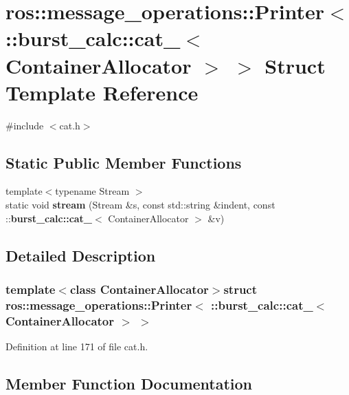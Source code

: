 \section{ros\-:\-:message\-\_\-operations\-:\-:\-Printer$<$ \-:\-:burst\-\_\-calc\-:\-:cat\-\_\-$<$ \-Container\-Allocator $>$ $>$ \-Struct \-Template \-Reference}
\label{structros_1_1message__operations_1_1Printer_3_01_1_1burst__calc_1_1cat___3_01ContainerAllocator_01_4_01_4}


{\ttfamily \#include $<$cat.\-h$>$}

\subsection*{\-Static \-Public \-Member \-Functions}
\begin{DoxyCompactItemize}
\item 
{\footnotesize template$<$typename Stream $>$ }\\static void {\bf stream} (\-Stream \&s, const std\-::string \&indent, const \-::{\bf burst\-\_\-calc\-::cat\-\_\-}$<$ \-Container\-Allocator $>$ \&v)
\end{DoxyCompactItemize}


\subsection{\-Detailed \-Description}
\subsubsection*{template$<$class Container\-Allocator$>$struct ros\-::message\-\_\-operations\-::\-Printer$<$ \-::burst\-\_\-calc\-::cat\-\_\-$<$ Container\-Allocator $>$ $>$}



\-Definition at line 171 of file cat.\-h.



\subsection{\-Member \-Function \-Documentation}
